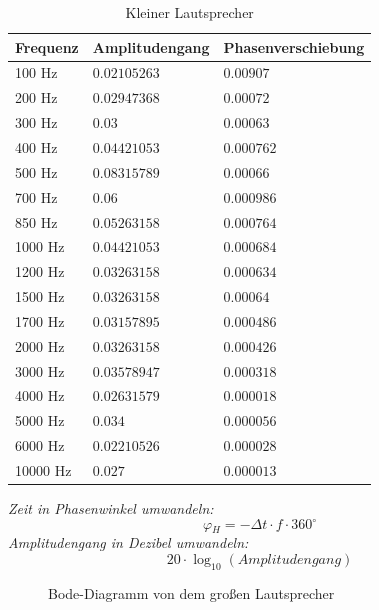 \documentclass[12pt, oneside, a4paper, \docLanguage]{report}
\begin{document}
\begin{table}[H]
\centering
\begin{tabular}{|l|l|l|}
\hline
\multicolumn{1}{|c|}{Frequenz} & \multicolumn{1}{c|}{Amplitudengang}		& \multicolumn{1}{c|}{Phasenverschiebung}			\\ \hline
100 Hz						&$0.02105263$			&$0.00907$				\\ \hline
200 Hz						&$0.02947368$			&$0.00072$				\\ \hline
300 Hz						&$0.03$					&$0.00063$				\\ \hline
400 Hz						&$0.04421053$			&$0.000762$				\\ \hline
500 Hz						&$0.08315789$			&$0.00066$				\\ \hline
700 Hz						&$0.06$					&$0.000986$				\\ \hline
850 Hz						&$0.05263158$			&$0.000764$				\\ \hline
1000 Hz						&$0.04421053$			&$0.000684$				\\ \hline
1200 Hz						&$0.03263158$			&$0.000634$				\\ \hline
1500 Hz						&$0.03263158$			&$0.00064$				\\ \hline
1700 Hz						&$0.03157895$			&$0.000486$				\\ \hline
2000 Hz						&$0.03263158$			&$0.000426$				\\ \hline
3000 Hz						&$0.03578947$			&$0.000318$				\\ \hline
4000 Hz						&$0.02631579$			&$0.000018$				\\ \hline
5000 Hz						&$0.034$				&$0.000056$				\\ \hline
6000 Hz						&$0.02210526$			&$0.000028$				\\ \hline
10000 Hz					&$0.027$				&$0.000013$				\\ \hline
\end{tabular}
\caption{Kleiner Lautsprecher}
\end{table}



\textit{Zeit in Phasenwinkel umwandeln:} $$\varphi{_H}=-{\Delta}t{\cdot}f{\cdot}360^{\circ}$$
\textit{Amplitudengang in Dezibel umwandeln:}$$20{\cdot}\log_{10} (Amplitudengang)$$


\begin{figure}[H]
\centering\small
{}
	\caption{Bode-Diagramm von dem großen Lautsprecher}
\end{figure}
\end{document}
